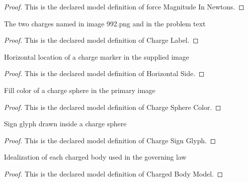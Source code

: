 \begin{proof}
  This is the declared model definition of force Magnitude In Newtons.
\end{proof}
\begin{definition}
  \label{def:physics:phyx-mini-0992:phyxminiproblems-problemphyxmini0992-chargelabel}
  The two charges named in image 992.png and in the problem text
\end{definition}
\begin{proof}
  This is the declared model definition of Charge Label.
\end{proof}
\begin{definition}
  \label{def:physics:phyx-mini-0992:phyxminiproblems-problemphyxmini0992-horizontalside}
  Horizontal location of a charge marker in the supplied image
\end{definition}
\begin{proof}
  This is the declared model definition of Horizontal Side.
\end{proof}
\begin{definition}
  \label{def:physics:phyx-mini-0992:phyxminiproblems-problemphyxmini0992-chargespherecolor}
  Fill color of a charge sphere in the primary image
\end{definition}
\begin{proof}
  This is the declared model definition of Charge Sphere Color.
\end{proof}
\begin{definition}
  \label{def:physics:phyx-mini-0992:phyxminiproblems-problemphyxmini0992-chargesignglyph}
  Sign glyph drawn inside a charge sphere
\end{definition}
\begin{proof}
  This is the declared model definition of Charge Sign Glyph.
\end{proof}
\begin{definition}
  \label{def:physics:phyx-mini-0992:phyxminiproblems-problemphyxmini0992-chargedbodymodel}
  Idealization of each charged body used in the governing law
\end{definition}
\begin{proof}
  This is the declared model definition of Charged Body Model.
\end{proof}
